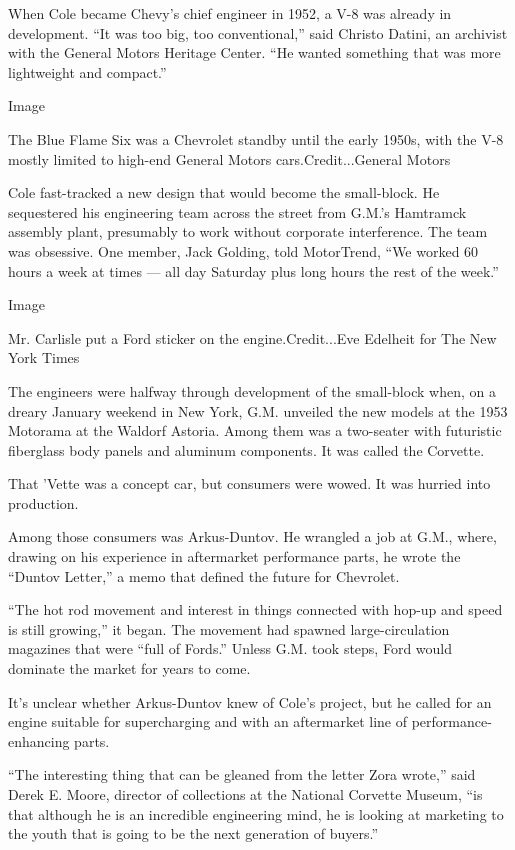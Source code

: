 When Cole became Chevy's chief engineer in 1952, a V-8 was already in
development. ``It was too big, too conventional,'' said Christo Datini,
an archivist with the General Motors Heritage Center. ``He wanted
something that was more lightweight and compact.''

Image

The Blue Flame Six was a Chevrolet standby until the early 1950s, with
the V-8 mostly limited to high-end General Motors cars.Credit...General
Motors

Cole fast-tracked a new design that would become the small-block. He
sequestered his engineering team across the street from G.M.'s Hamtramck
assembly plant, presumably to work without corporate interference. The
team was obsessive. One member, Jack Golding, told MotorTrend, ``We
worked 60 hours a week at times --- all day Saturday plus long hours the
rest of the week.''

Image

Mr. Carlisle put a Ford sticker on the engine.Credit...Eve Edelheit for
The New York Times

The engineers were halfway through development of the small-block when,
on a dreary January weekend in New York, G.M. unveiled the new models at
the 1953 Motorama at the Waldorf Astoria. Among them was a two-seater
with futuristic fiberglass body panels and aluminum components. It was
called the Corvette.

That 'Vette was a concept car, but consumers were wowed. It was hurried
into production.

Among those consumers was Arkus-Duntov. He wrangled a job at G.M.,
where, drawing on his experience in aftermarket performance parts, he
wrote the ``Duntov Letter,'' a memo that defined the future for
Chevrolet.

``The hot rod movement and interest in things connected with hop-up and
speed is still growing,'' it began. The movement had spawned
large-circulation magazines that were ``full of Fords.'' Unless G.M.
took steps, Ford would dominate the market for years to come.

It's unclear whether Arkus-Duntov knew of Cole's project, but he called
for an engine suitable for supercharging and with an aftermarket line of
performance-enhancing parts.

``The interesting thing that can be gleaned from the letter Zora
wrote,'' said Derek E. Moore, director of collections at the National
Corvette Museum, ``is that although he is an incredible engineering
mind, he is looking at marketing to the youth that is going to be the
next generation of buyers.''

